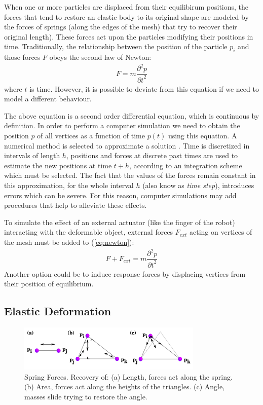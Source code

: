 \documentclass[journal]{IEEEtran}
\newcommand{\eref}[1]{(\ref{#1})}
\begin{document}
When one or more particles are displaced from their equilibirum positions, the forces that tend to restore an elastic body to its original shape are modeled by the forces of springs (along the edges of the mesh) that try to recover their original length).  These forces act upon the particles modifying their positions in time.  Traditionally, the relationship between the position of the particle $p_i$ and those forces $F$ obeys the second law of Newton:
\begin{align}
 F = m \dfrac{\partial^2 p}{{\partial t}^2} \label{eq:newton}
\end{align}
where $t$ is time.  However, it is possible to deviate from this equation if we need to model a different behaviour. %

The above equation is a second order differential equation, which is continuous by definition.  In order to perform a computer simulation we need to obtain the position $p$ of all vertices as a function of time $p(t)$ using this equation.  A numerical method is selected to approximate a solution \cite{Nealen2006review}.  Time is discretized in intervals of length $h$, positions and forces at discrete past times are used to estimate the new positions at time $t + h$, according to an integration scheme which must be selected.  The fact that the values of the forces remain constant in this approximation, for the whole interval $h$ (also know as \textit{time step}), introduces errors which can be severe.  For this reason, computer simulations may add procedures that help to alleviate these effects.  

To simulate the effect of an external actuator (like the finger of the robot) interacting with the deformable object, external forces $F_{ext}$ acting on vertices of the mesh must be added to \eref{eq:newton}:
\begin{align}
 F + F_{ext} = m \dfrac{\partial^2 p}{{\partial t}^2}
\end{align}
Another option could be to induce response forces by displacing vertices from their position of equilibrium.


\label{sec:model}
\subsection{Elastic Deformation}

\begin{figure}[t]
\centering
\includegraphics[width=88mm]{arrio1}
\caption{Spring Forces. Recovery of: (a) Length, forces act along the spring.  (b) Area, forces act along the heights of the triangles. (c) Angle, masses slide trying to restore the angle.}
\label{fig:forces}
\end{figure}
\end{document}
